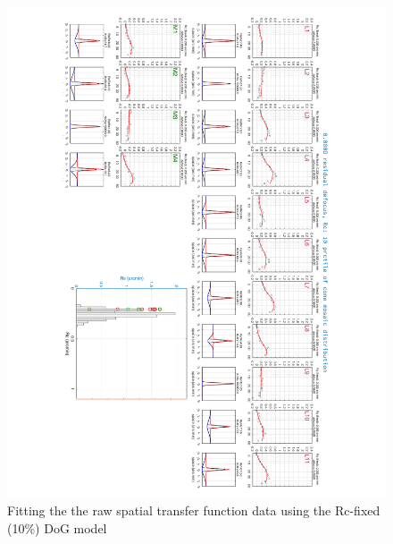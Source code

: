 \documentclass[11pt, oneside]{article}   	%
\begin{document}
\begin{figure}[htbp] %
   \centering
   \includegraphics[width=7in]{Slide2.pdf} 
   \caption{Fitting the the raw spatial transfer function data using the Rc-fixed (10\%) DoG model}
   \label{fig:example}
\end{figure}
\end{document}
